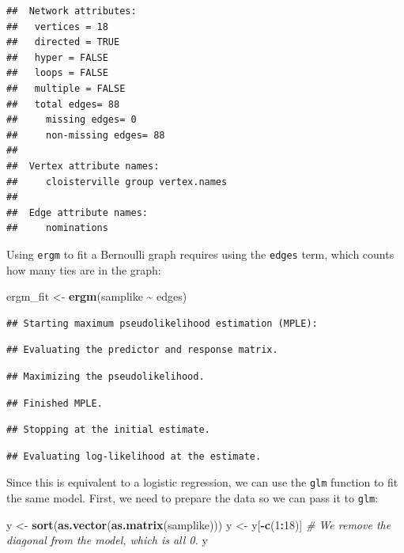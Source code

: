 \documentclass[
]{book}
\newenvironment{Shaded}{\begin{snugshade}}{\end{snugshade}}
\newcommand{\CommentTok}[1]{\textcolor[rgb]{0.56,0.35,0.01}{\textit{#1}}}
\newcommand{\DecValTok}[1]{\textcolor[rgb]{0.00,0.00,0.81}{#1}}
\newcommand{\FunctionTok}[1]{\textcolor[rgb]{0.13,0.29,0.53}{\textbf{#1}}}
\newcommand{\NormalTok}[1]{#1}
\newcommand{\OtherTok}[1]{\textcolor[rgb]{0.56,0.35,0.01}{#1}}
\newcommand{\SpecialCharTok}[1]{\textcolor[rgb]{0.81,0.36,0.00}{\textbf{#1}}}
\begin{document}
\begin{verbatim}
##  Network attributes:
##   vertices = 18 
##   directed = TRUE 
##   hyper = FALSE 
##   loops = FALSE 
##   multiple = FALSE 
##   total edges= 88 
##     missing edges= 0 
##     non-missing edges= 88 
## 
##  Vertex attribute names: 
##     cloisterville group vertex.names 
## 
##  Edge attribute names: 
##     nominations
\end{verbatim}

Using \texttt{ergm} to fit a Bernoulli graph requires using the \texttt{edges} term, which counts how many ties are in the graph:

\begin{Shaded}
\begin{Highlighting}[]
\NormalTok{ergm\_fit }\OtherTok{\textless{}{-}} \FunctionTok{ergm}\NormalTok{(samplike }\SpecialCharTok{\textasciitilde{}}\NormalTok{ edges)}
\end{Highlighting}
\end{Shaded}

\begin{verbatim}
## Starting maximum pseudolikelihood estimation (MPLE):
\end{verbatim}

\begin{verbatim}
## Evaluating the predictor and response matrix.
\end{verbatim}

\begin{verbatim}
## Maximizing the pseudolikelihood.
\end{verbatim}

\begin{verbatim}
## Finished MPLE.
\end{verbatim}

\begin{verbatim}
## Stopping at the initial estimate.
\end{verbatim}

\begin{verbatim}
## Evaluating log-likelihood at the estimate.
\end{verbatim}

Since this is equivalent to a logistic regression, we can use the \texttt{glm} function to fit the same model. First, we need to prepare the data so we can pass it to \texttt{glm}:

\begin{Shaded}
\begin{Highlighting}[]
\NormalTok{y }\OtherTok{\textless{}{-}} \FunctionTok{sort}\NormalTok{(}\FunctionTok{as.vector}\NormalTok{(}\FunctionTok{as.matrix}\NormalTok{(samplike)))}
\NormalTok{y }\OtherTok{\textless{}{-}}\NormalTok{ y[}\SpecialCharTok{{-}}\FunctionTok{c}\NormalTok{(}\DecValTok{1}\SpecialCharTok{:}\DecValTok{18}\NormalTok{)] }\CommentTok{\# We remove the diagonal from the model, which is all 0.}
\NormalTok{y}
\end{Highlighting}
\end{Shaded}
\end{document}
